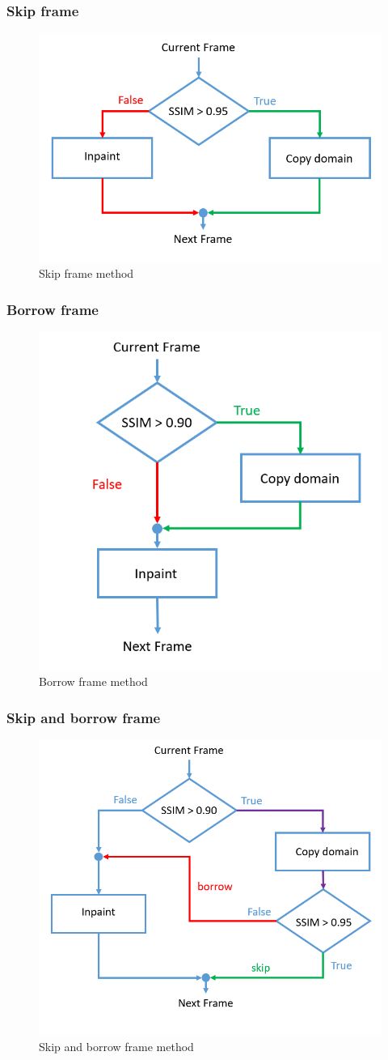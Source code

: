 \documentclass[xcolor=dvipsnames, xetex,serif]{beamer}
\begin{document}
    \begin{frame}
        \frametitle{Skip frame}  
        \begin{figure}[H]
            \centering
            \includegraphics[width=0.6\linewidth]{images/skipborrow/flowchart-skip.png}
            \caption{Skip frame method}
        \end{figure}      
    \end{frame}
    \begin{frame}
        \frametitle{Borrow frame}      
        \begin{figure}[H]
            \centering
            \includegraphics[width=0.6\linewidth]{images/skipborrow/flowchart-borrow.png}
            \caption{Borrow frame method}
        \end{figure}   
    \end{frame}
    \begin{frame}
        \frametitle{Skip and borrow frame}  
        \begin{figure}[H]
            \centering
            \includegraphics[width=0.6\linewidth]{images/skipborrow/flowchart-skipandborrow.png}
            \caption{Skip and borrow frame method}
        \end{figure}        
    \end{frame}
\end{document}
